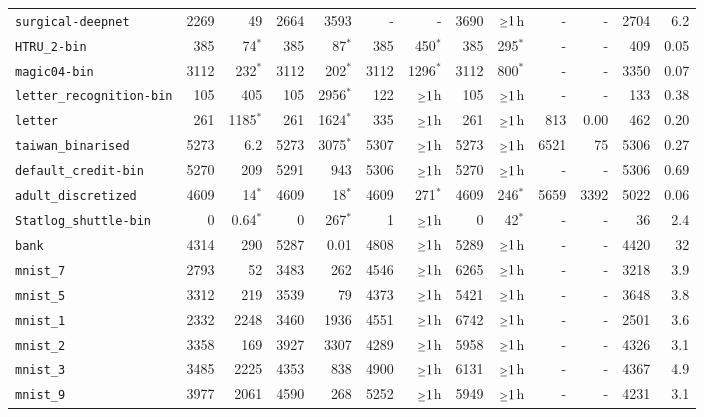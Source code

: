 \begin{tabular}{lrrrrrrrrrrrr}
\texttt{surgical-deepnet} & 2269 & 49 & 2664 & 3593 & - & - & 3690 & $\mathsmaller{\geq}1$h & - & - & 2704 & 6.2\\
\texttt{HTRU\_2-bin} & 385 & 74$^*$ & 385 & 87$^*$ & 385 & 450$^*$ & 385 & 295$^*$ & - & - & 409 & 0.05\\
\texttt{magic04-bin} & 3112 & 232$^*$ & 3112 & 202$^*$ & 3112 & 1296$^*$ & 3112 & 800$^*$ & - & - & 3350 & 0.07\\
\texttt{letter\_recognition-bin} & 105 & 405 & 105 & 2956$^*$ & 122 & $\mathsmaller{\geq}1$h & 105 & $\mathsmaller{\geq}1$h & - & - & 133 & 0.38\\
\texttt{letter} & 261 & 1185$^*$ & 261 & 1624$^*$ & 335 & $\mathsmaller{\geq}1$h & 261 & $\mathsmaller{\geq}1$h & 813 & 0.00 & 462 & 0.20\\
\texttt{taiwan\_binarised} & 5273 & 6.2 & 5273 & 3075$^*$ & 5307 & $\mathsmaller{\geq}1$h & 5273 & $\mathsmaller{\geq}1$h & 6521 & 75 & 5306 & 0.27\\
\texttt{default\_credit-bin} & 5270 & 209 & 5291 & 943 & 5306 & $\mathsmaller{\geq}1$h & 5270 & $\mathsmaller{\geq}1$h & - & - & 5306 & 0.69\\
\texttt{adult\_discretized} & 4609 & 14$^*$ & 4609 & 18$^*$ & 4609 & 271$^*$ & 4609 & 246$^*$ & 5659 & 3392 & 5022 & 0.06\\
\texttt{Statlog\_shuttle-bin} & 0 & 0.64$^*$ & 0 & 267$^*$ & 1 & $\mathsmaller{\geq}1$h & 0 & 42$^*$ & - & - & 36 & 2.4\\
\texttt{bank} & 4314 & 290 & 5287 & 0.01 & 4808 & $\mathsmaller{\geq}1$h & 5289 & $\mathsmaller{\geq}1$h & - & - & 4420 & 32\\
\texttt{mnist\_7} & 2793 & 52 & 3483 & 262 & 4546 & $\mathsmaller{\geq}1$h & 6265 & $\mathsmaller{\geq}1$h & - & - & 3218 & 3.9\\
\texttt{mnist\_5} & 3312 & 219 & 3539 & 79 & 4373 & $\mathsmaller{\geq}1$h & 5421 & $\mathsmaller{\geq}1$h & - & - & 3648 & 3.8\\
\texttt{mnist\_1} & 2332 & 2248 & 3460 & 1936 & 4551 & $\mathsmaller{\geq}1$h & 6742 & $\mathsmaller{\geq}1$h & - & - & 2501 & 3.6\\
\texttt{mnist\_2} & 3358 & 169 & 3927 & 3307 & 4289 & $\mathsmaller{\geq}1$h & 5958 & $\mathsmaller{\geq}1$h & - & - & 4326 & 3.1\\
\texttt{mnist\_3} & 3485 & 2225 & 4353 & 838 & 4900 & $\mathsmaller{\geq}1$h & 6131 & $\mathsmaller{\geq}1$h & - & - & 4367 & 4.9\\
\texttt{mnist\_9} & 3977 & 2061 & 4590 & 268 & 5252 & $\mathsmaller{\geq}1$h & 5949 & $\mathsmaller{\geq}1$h & - & - & 4231 & 3.1\\

\end{tabular}
